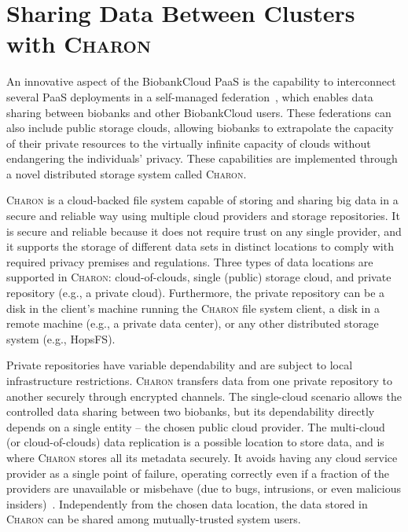 \section{Sharing Data Between Clusters with \textsc{Charon}}
\label{charon}

An innovative aspect of the BiobankCloud PaaS is the capability to interconnect several PaaS deployments in a self-managed federation~\cite{ebb13}, which enables data sharing between biobanks and other BiobankCloud users.
These federations can also include public storage clouds, allowing biobanks to extrapolate the capacity of their private resources to the virtually infinite capacity of clouds without endangering the individuals' privacy.
These capabilities are implemented through a novel distributed storage system called \textsc{Charon}.

\textsc{Charon} is a cloud-backed file system capable of storing and sharing big data in a secure and reliable way using multiple cloud providers and storage repositories.
It is secure and reliable because it does not require trust on any single provider, and it supports the storage of different data sets in distinct locations to comply with required privacy premises and regulations.
Three types of data locations are supported in \textsc{Charon}: cloud-of-clouds, single (public) storage cloud, and private repository (e.g., a private cloud).
Furthermore, the private repository can be a disk in the client's machine running the \textsc{Charon} file system client, a disk in a remote machine (e.g., a private data center), or any other distributed storage system (e.g., HopsFS).

Private repositories have variable dependability and are subject to local infrastructure restrictions.
\textsc{Charon} transfers data from one private repository to another securely through encrypted channels.
The single-cloud scenario allows the controlled data sharing between two biobanks, but its dependability directly depends on a single entity -- the chosen public cloud provider.
The multi-cloud (or cloud-of-clouds) data replication is a possible location to store data, and is where \textsc{Charon} stores all its metadata securely.
It avoids having any cloud service provider as a single point of failure, operating correctly even if a fraction of the providers are unavailable or misbehave (due to bugs, intrusions, or even malicious insiders)~\cite{depsky13}.
Independently from the chosen data location, the data stored in \textsc{Charon} can be shared among mutually-trusted system users.

